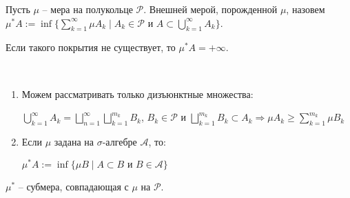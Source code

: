 \begin{definition}
    Пусть $\mu$ – мера на полукольце $\mathcal{P}$. Внешней мерой, порожденной $\mu$, назовем
    $\mu^* A:=\inf \{\sum\limits_{k=1}^\infty \mu A_k\mid A_k\in \mathcal{P}\text{ и } A\subset \bigcup\limits_{k=1}^\infty A_k\}$.

    Если такого покрытия не существует, то $\mu^* A = +\infty$.
\end{definition}

\begin{remark}~
    \begin{enumerate}
        \item Можем рассматривать только дизъюнктные множества:
        
        $\bigcup\limits_{k=1}^\infty A_k = \bigsqcup\limits_{n=1}^\infty\bigsqcup \limits_{k=1}^{m_k} B_k$, 
        $B_k\in \mathcal{P}$ и $\bigsqcup\limits_{k=1}^{m_k} B_k \subset A_k\Rightarrow\mu A_k \geq \sum \limits_{k=1}^{m_k} \mu B_k$

        \item Если $\mu$ задана на $\sigma$-алгебре $\mathcal{A}$, то:
        
        $\mu^*A :=\inf \{\mu B\mid A \subset B\text{ и } B \in \mathcal{A}\}$
    \end{enumerate}
\end{remark}

\begin{theorem}
    $\mu^*$ – субмера, совпадающая с $\mu$ на $\mathcal{P}$.
\end{theorem}


